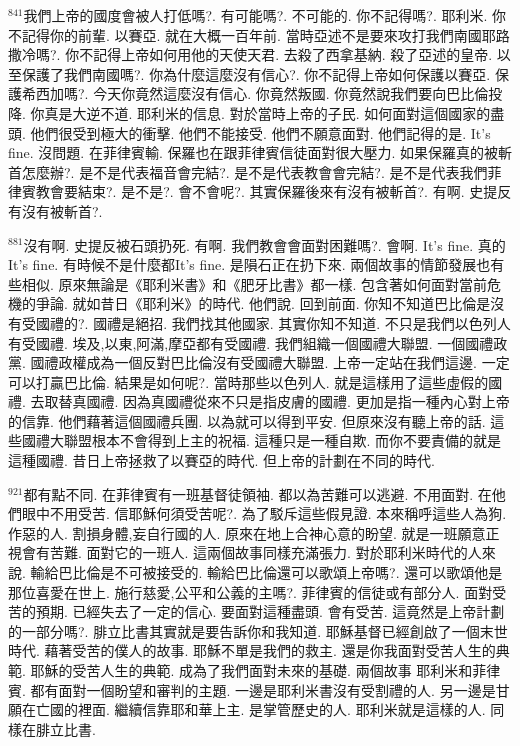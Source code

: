\documentclass{book}
\begin{document}
$^{841}$我們上帝的國度會被人打低嗎?.
有可能嗎?.
不可能的.
你不記得嗎?.
耶利米.
你不記得你的前輩.
以賽亞.
就在大概一百年前.
當時亞述不是要來攻打我們南國耶路撒冷嗎?.
你不記得上帝如何用他的天使天君.
去殺了西拿基納.
殺了亞述的皇帝.
以至保護了我們南國嗎?.
你為什麼這麼沒有信心?.
你不記得上帝如何保護以賽亞.
保護希西加嗎?.
今天你竟然這麼沒有信心.
你竟然叛國.
你竟然說我們要向巴比倫投降.
你真是大逆不道.
耶利米的信息.
對於當時上帝的子民.
如何面對這個國家的盡頭.
他們很受到極大的衝擊.
他們不能接受.
他們不願意面對.
他們記得的是.
It's fine.
沒問題.
在菲律賓輸.
保羅也在跟菲律賓信徒面對很大壓力.
如果保羅真的被斬首怎麼辦?.
是不是代表福音會完結?.
是不是代表教會會完結?.
是不是代表我們菲律賓教會要結束?.
是不是?.
會不會呢?.
其實保羅後來有沒有被斬首?.
有啊.
史提反有沒有被斬首?.

$^{881}$沒有啊.
史提反被石頭扔死.
有啊.
我們教會會面對困難嗎?.
會啊.
It's fine.
真的It's fine.
有時候不是什麼都It's fine.
是隕石正在扔下來.
兩個故事的情節發展也有些相似.
原來無論是《耶利米書》和《肥牙比書》都一樣.
包含著如何面對當前危機的爭論.
就如昔日《耶利米》的時代.
他們說.
回到前面.
你知不知道巴比倫是沒有受國禮的?.
國禮是絕招.
我們找其他國家.
其實你知不知道.
不只是我們以色列人有受國禮.
埃及,以東,阿滿,摩亞都有受國禮.
我們組織一個國禮大聯盟.
一個國禮政黨.
國禮政權成為一個反對巴比倫沒有受國禮大聯盟.
上帝一定站在我們這邊.
一定可以打贏巴比倫.
結果是如何呢?.
當時那些以色列人.
就是這樣用了這些虛假的國禮.
去取替真國禮.
因為真國禮從來不只是指皮膚的國禮.
更加是指一種內心對上帝的信靠.
他們藉著這個國禮兵團.
以為就可以得到平安.
但原來沒有聽上帝的話.
這些國禮大聯盟根本不會得到上主的祝福.
這種只是一種自欺.
而你不要責備的就是這種國禮.
昔日上帝拯救了以賽亞的時代.
但上帝的計劃在不同的時代.

$^{921}$都有點不同.
在菲律賓有一班基督徒領袖.
都以為苦難可以逃避.
不用面對.
在他們眼中不用受苦.
信耶穌何須受苦呢?.
為了駁斥這些假見證.
本來稱呼這些人為狗.
作惡的人.
割損身體,妄自行國的人.
原來在地上合神心意的盼望.
就是一班願意正視會有苦難.
面對它的一班人.
這兩個故事同樣充滿張力.
對於耶利米時代的人來說.
輸給巴比倫是不可被接受的.
輸給巴比倫還可以歌頌上帝嗎?.
還可以歌頌他是那位喜愛在世上.
施行慈愛,公平和公義的主嗎?.
菲律賓的信徒或有部分人.
面對受苦的預期.
已經失去了一定的信心.
要面對這種盡頭.
會有受苦.
這竟然是上帝計劃的一部分嗎?.
腓立比書其實就是要告訴你和我知道.
耶穌基督已經創啟了一個末世時代.
藉著受苦的僕人的故事.
耶穌不單是我們的救主.
還是你我面對受苦人生的典範.
耶穌的受苦人生的典範.
成為了我們面對未來的基礎.
兩個故事 耶利米和菲律賓.
都有面對一個盼望和審判的主題.
一邊是耶利米書沒有受割禮的人.
另一邊是甘願在亡國的裡面.
繼續信靠耶和華上主.
是掌管歷史的人.
耶利米就是這樣的人.
同樣在腓立比書.
\end{document}
